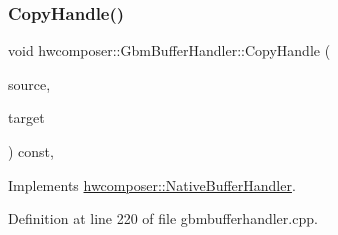 \subsubsection{\texorpdfstring{Copy\+Handle()}{CopyHandle()}}
{\footnotesize\ttfamily void hwcomposer\+::\+Gbm\+Buffer\+Handler\+::\+Copy\+Handle (\begin{DoxyParamCaption}\item[{\mbox{\hyperlink{alios_2platformdefines_8h_ac0a2eaf260f556d17fe489911f017bdf}{H\+W\+C\+Native\+Handle}}}]{source,  }\item[{\mbox{\hyperlink{alios_2platformdefines_8h_ac0a2eaf260f556d17fe489911f017bdf}{H\+W\+C\+Native\+Handle}} $\ast$}]{target }\end{DoxyParamCaption}) const\hspace{0.3cm}{\ttfamily [override]}, {\ttfamily [virtual]}}



Implements \mbox{\hyperlink{classhwcomposer_1_1NativeBufferHandler_a96581fb8bd36e959c8da6b9f634ecd32}{hwcomposer\+::\+Native\+Buffer\+Handler}}.



Definition at line 220 of file gbmbufferhandler.\+cpp.



